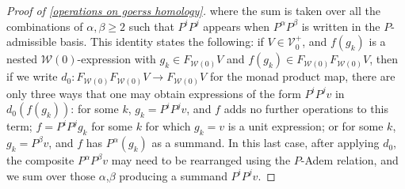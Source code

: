 \documentclass[11pt]{amsart}
\theoremstyle{plain}
\theoremstyle{definition}
\renewcommand{\to}{\longrightarrow}
\newcommand{\calV}{\mathcal{V}}
\newcommand{\calw}{\mathcal{W}}
\theoremstyle{plain}
\newcommand{\vect}[2]{\calV^{#1}_{#2}}
\begin{document}
\begin{Cohomology Operations for W and U}
\begin{proof}[Proof of \ref{operations on goerss homology}]
where the sum is taken over all the combinations of $\alpha,\beta\geq2$ such that $P^iP^j$ appears when $P^\alpha P^\beta$ is written in the $P$-admissible basis. This identity states the following: if $V\in\vect{+}{0}$, and $f(g_k)$ is a nested $\calw(0)$-expression with $g_k\in F_{\calw(0)}V$ and $f(g_k)\in F_{\calw(0)}F_{\calw(0)}V$, then if we write $d_0:F_{\calw(0)}F_{\calw(0)}V\to F_{\calw(0)}V$ for the monad product map, there are only three ways that one may obtain expressions of the form $P^iP^jv$ in $d_0(f(g_k))$: for some $k$, $g_k=P^iP^jv$, and $f $ adds no further operations to this term; $f=P^iP^jg_{k}$ for some $k$ for which $g_{k}=v$ is a unit expression; or for some $k$, $g_k=P^\beta v$, and  $f$ has $P^\alpha(g_k)$ as a summand. In this last case, after applying $d_0$, the composite $P^{\alpha}P^{\beta}v$ may need to be rearranged using the $P$-Adem relation, and we sum over those $\alpha$,$\beta$ producing a summand $P^iP^jv$.


\end{proof}
\end{Cohomology Operations for W and U}
\end{document}
